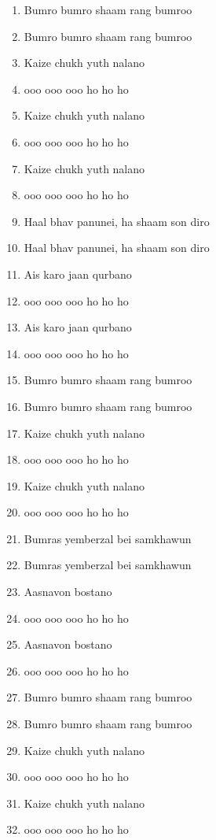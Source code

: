 \documentclass[12pt]{article}
\newcommand{\bigroman}[1]{\fontsize{16pt}{18pt}\selectfont\RaggedRight #1}
\begin{document}
\begin{multicols}{2}
\begin{multicols}{2}
\begin{enumerate}[leftmargin=*, label=\arabic*., font=\fontsize{16pt}{18pt}\selectfont]
  \item \bigroman{Bumro bumro shaam rang bumroo}
  \item \bigroman{Bumro bumro shaam rang bumroo}
  \item \bigroman{Kaize chukh yuth nalano}
  \item \bigroman{ooo ooo ooo ho ho ho}
  \item \bigroman{Kaize chukh yuth nalano}
  \item \bigroman{ooo ooo ooo ho ho ho}
  \item \bigroman{Kaize chukh yuth nalano}
  \item \bigroman{ooo ooo ooo ho ho ho}
  \item \bigroman{Haal bhav panunei, ha shaam son diro}
  \item \bigroman{Haal bhav panunei, ha shaam son diro}
  \item \bigroman{Ais karo jaan qurbano}
  \item \bigroman{ooo ooo ooo ho ho ho}
  \item \bigroman{Ais karo jaan qurbano}
  \item \bigroman{ooo ooo ooo ho ho ho}
  \item \bigroman{Bumro bumro shaam rang bumroo}
  \item \bigroman{Bumro bumro shaam rang bumroo}
  \item \bigroman{Kaize chukh yuth nalano}
  \item \bigroman{ooo ooo ooo ho ho ho}
  \item \bigroman{Kaize chukh yuth nalano}
  \item \bigroman{ooo ooo ooo ho ho ho}
  \item \bigroman{Bumras yemberzal bei samkhawun}
  \item \bigroman{Bumras yemberzal bei samkhawun}
  \item \bigroman{Aasnavon bostano}
  \item \bigroman{ooo ooo ooo ho ho ho}
  \item \bigroman{Aasnavon bostano}
  \item \bigroman{ooo ooo ooo ho ho ho}
  \item \bigroman{Bumro bumro shaam rang bumroo}
  \item \bigroman{Bumro bumro shaam rang bumroo}
  \item \bigroman{Kaize chukh yuth nalano}
  \item \bigroman{ooo ooo ooo ho ho ho}
  \item \bigroman{Kaize chukh yuth nalano}
  \item \bigroman{ooo ooo ooo ho ho ho}
\end{enumerate}


\end{multicols}
\end{multicols}
\end{document}
